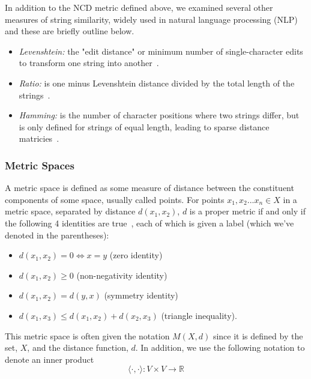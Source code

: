\documentclass[conference]{IEEEtran}
\begin{document}
In addition to the NCD metric defined above, we examined several other measures of string similarity, widely used in natural language processing (NLP) and these are briefly outline below. 
\begin{itemize}
    \item \textit{Levenshtein:} the "edit distance" or minimum number of single-character edits to transform one string into another~\cite{navarro2001guided}.
    \item \textit{Ratio:} is one minus Levenshtein distance divided by the total length of the strings~\cite{levenshtein}.
    \item \textit{Hamming:} is the number of character positions where two strings differ, but is only defined for strings of equal length, leading to sparse distance matricies~\cite{hamming_distance}.
\end{itemize}



\subsubsection{Metric Spaces}

A metric space is defined as some measure of distance between the constituent components of some space, usually called points.  For points $x_1,x_2...x_n \in X$ in a metric space, separated by distance $d(x_1,x_2)$, $d$ is a proper metric if and only if the following 4 identities are true~\cite{metrics}, each of which is given a label (which we've denoted in the parentheses):

\label{metric_spaces}
\begin{itemize}
    \item $d(x_1,x_2) = 0 \iff x = y$ (zero identity)
    \item $d(x_1,x_2) \geq 0$ (non-negativity identity)
    \item $d(x_1,x_2) = d(y, x)$ (symmetry identity)
    \item $d(x_1, x_3) \leq d(x_1,x_2) + d(x_2,x_3)$ (triangle inequality).
\end{itemize}
This metric space is often given the notation $M(X,d)$ since it is defined by the set, $X$, and the distance function, $d$.
In addition, we use the following notation to denote an inner product
$$
\langle \cdot , \cdot \rangle : V \times V \rightarrow \mathbb{R}
$$
\end{document}
